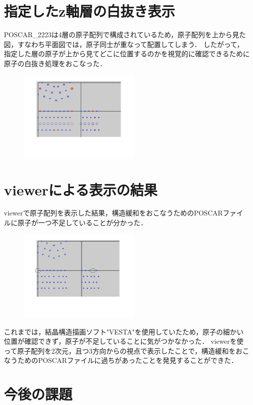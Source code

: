 \section{指定したz軸層の白抜き表示}
POSCAR\_2223は4層の原子配列で構成されているため，原子配列を上から見た図，すなわち平面図では，原子同士が重なって配置してしまう．
したがって，指定した層の原子が上から見てどこに位置するのかを視覚的に確認できるために原子の白抜き処理をおこなった．

\begin{figure}[htbp]\begin{center}
\includegraphics[width=6cm,bb=0 0 442 500]{../figs/./boundary_narita.012.jpg}
\caption{}
\label{default}\end{center}\end{figure}
\section{viewerによる表示の結果}
viewerで原子配列を表示した結果，構造緩和をおこなうためのPOSCARファイルに原子が一つ不足していることが分かった．

\begin{figure}[htbp]\begin{center}
\includegraphics[width=6cm,bb=0 0 442 500]{../figs/./boundary_narita.013.jpg}
\caption{}
\label{default}\end{center}\end{figure}
これまでは，結晶構造描画ソフト"VESTA"を使用していたため，原子の細かい位置が確認できず，原子が不足していることに気がつかなかった．
viewerを使って原子配列を2次元，且つ3方向からの視点で表示したことで，構造緩和をおこなうためのPOSCARファイルに過ちがあったことを発見することができた．

\section{今後の課題}
